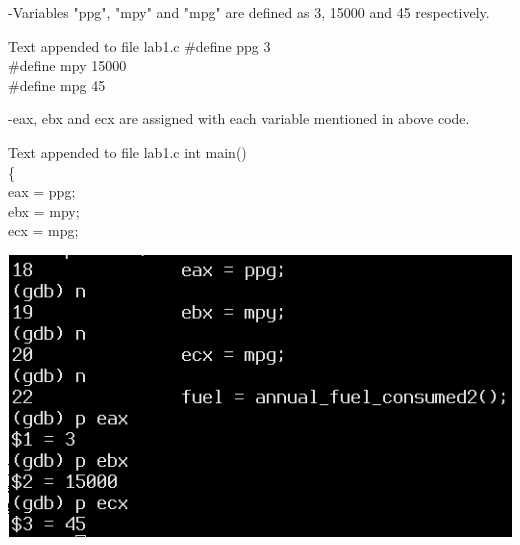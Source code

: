 \documentclass{article}
\begin{document}
-Variables "ppg", "mpy" and "mpg" are defined as 3, 15000 and 45 respectively.
\begin{GFT}{Text appended to file lab1.c}
\+\#define ppg 3\\
\+\#define mpy 15000\\
\+\#define mpg 45\\
\end{GFT}
\noindent{\color{red}\rule{\linewidth}{0.5mm}}
-eax, ebx and ecx are assigned with each variable mentioned in above code. \\
\begin{multicols}{2}
\begin{GFT}{Text appended to file lab1.c}
\+int main()\\
\+\{\\
\+eax = ppg;\\
\+ebx = mpy;\\
\+ecx = mpg;\\
\end{GFT}
\columnbreak
\centering
\includegraphics[scale = 0.4]{varc.png}
\end{multicols}
\noindent{\color{red}\rule{\linewidth}{0.5mm}} \\

\clearpage
\end{document}
